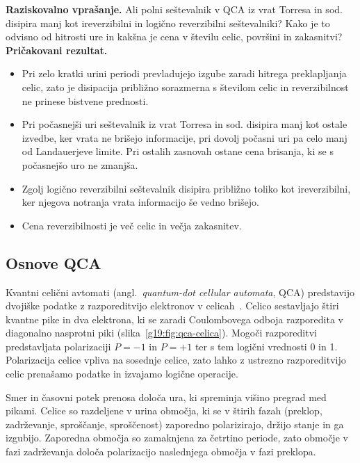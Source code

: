 \begin{svgraybox}
\textbf{Raziskovalno vprašanje.}
Ali polni seštevalnik v QCA iz vrat Torresa in sod. disipira manj kot ireverzibilni in logično reverzibilni seštevalniki? Kako je to odvisno od hitrosti ure in kakšna je cena v številu celic, površini in zakasnitvi?
\textbf{Pričakovani rezultat.}
\begin{itemize}
    \item Pri zelo kratki urini periodi prevladujejo izgube zaradi hitrega preklapljanja celic, zato je disipacija približno sorazmerna s številom celic in reverzibilnost ne prinese bistvene prednosti.
    \item Pri počasnejši uri seštevalnik iz vrat Torresa in sod. disipira manj kot ostale izvedbe, ker vrata ne brišejo informacije, pri dovolj počasni uri pa celo manj od Landauerjeve limite. Pri ostalih zasnovah ostane cena brisanja, ki se s počasnejšo uro ne zmanjša.
    \item Zgolj logično reverzibilni seštevalnik disipira približno toliko kot ireverzibilni, ker njegova notranja vrata informacijo še vedno brišejo.
    \item Cena reverzibilnosti je več celic in večja zakasnitev.
\end{itemize}

\end{svgraybox}

\subsection{Osnove QCA}

Kvantni celični avtomati (angl.\ \textit{quantum-dot cellular automata}, QCA) predstavijo dvojiške podatke z razporeditvijo elektronov v celicah~\cite{lent1997}. Celico sestavljajo štiri kvantne pike in dva elektrona, ki se zaradi Coulombovega odboja razporedita v diagonalno nasprotni piki (slika~\ref{g19:fig:qca-celica}). Mogoči razporeditvi predstavljata polarizaciji $P = -1$ in $P = +1$ ter s tem logični vrednosti 0 in 1. Polarizacija celice vpliva na sosednje celice, zato lahko z ustrezno razporeditvijo celic prenašamo podatke in izvajamo logične operacije.

Smer in časovni potek prenosa določa ura, ki spreminja višino pregrad med pikami. Celice so razdeljene v urina območja, ki se v štirih fazah (preklop, zadrževanje, sproščanje, sproščenost) zaporedno polarizirajo, držijo stanje in ga izgubijo. Zaporedna območja so zamaknjena za četrtino periode, zato območje v fazi zadrževanja določa polarizacijo naslednjega območja v fazi preklopa.

